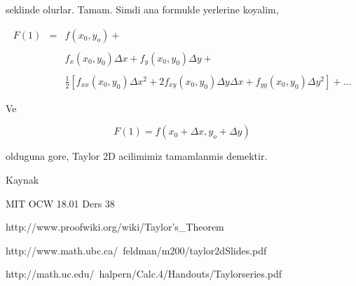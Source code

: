 \documentclass[12pt,fleqn]{article}\usepackage{../common}
\begin{document}
seklinde olurlar. Tamam. Simdi ana formulde yerlerine koyalim,

$$ 
\begin{array}{lll}
F(1) &=& f(x_0 , y_o) +  \\ \\ 
&& f_x(x_0,y_0) \Delta x + f_y(x_0,y_0) \Delta y +   \\ \\
&& \frac{1}{2} 
[ 
f_{xx}(x_0,y_0)\Delta x^2 + 
2f_{xy}(x_0,y_0)\Delta y \Delta x +
f_{yy}(x_0,y_0)\Delta y^2 
] + ... 
\end{array}
 $$


Ve

$$  F(1) = f(x_0 +\Delta x, y_o + \Delta y) $$ 

olduguna gore, Taylor 2D acilimimiz tamamlanmis demektir. 

Kaynak

MIT OCW 18.01 Ders 38

http://www.proofwiki.org/wiki/Taylor's\_Theorem

http://www.math.ubc.ca/~feldman/m200/taylor2dSlides.pdf

http://math.uc.edu/~halpern/Calc.4/Handouts/Taylorseries.pdf
\end{document}
